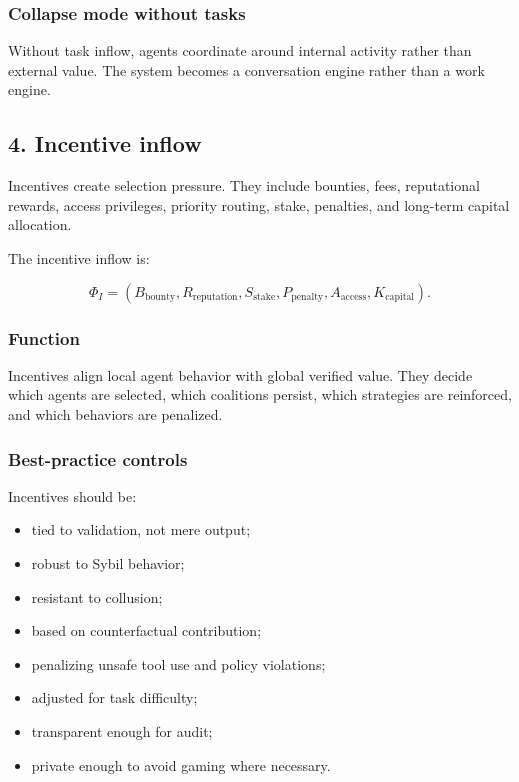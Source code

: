 \documentclass[11pt]{article}
\providecommand{\tightlist}{\setlength{\itemsep}{0pt}\setlength{\parskip}{0pt}}
\begin{document}
\subsubsection{Collapse mode without
tasks}\label{collapse-mode-without-tasks}

Without task inflow, agents coordinate around internal activity rather
than external value. The system becomes a conversation engine rather
than a work engine.

\subsection{4. Incentive inflow}\label{incentive-inflow}

Incentives create selection pressure. They include bounties, fees,
reputational rewards, access privileges, priority routing, stake,
penalties, and long-term capital allocation.

The incentive inflow is:

\[
\Phi_I=(B_{\text{bounty}},R_{\text{reputation}},S_{\text{stake}},P_{\text{penalty}},A_{\text{access}},K_{\text{capital}}).
\]

\subsubsection{Function}\label{function-3}

Incentives align local agent behavior with global verified value. They
decide which agents are selected, which coalitions persist, which
strategies are reinforced, and which behaviors are penalized.

\subsubsection{Best-practice controls}\label{best-practice-controls-3}

Incentives should be:

\begin{itemize}
\tightlist
\item
  tied to validation, not mere output;
\item
  robust to Sybil behavior;
\item
  resistant to collusion;
\item
  based on counterfactual contribution;
\item
  penalizing unsafe tool use and policy violations;
\item
  adjusted for task difficulty;
\item
  transparent enough for audit;
\item
  private enough to avoid gaming where necessary.
\end{itemize}
\end{document}
